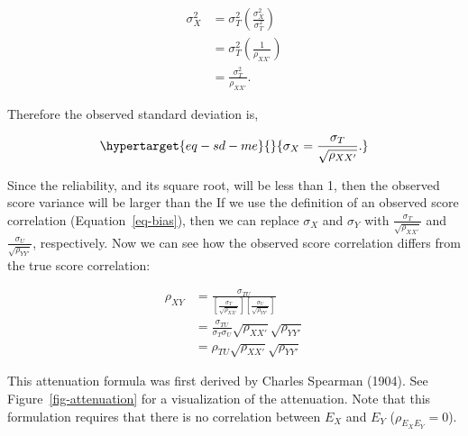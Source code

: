 \documentclass[
  letterpaper,
  DIV=11,
  numbers=noendperiod]{scrreprt}
\begin{document}
\[\begin{aligned}
\sigma^2_X &=\sigma^2_{T} \left(\frac{\sigma^2_{X}}{\sigma^2_{T}} \right)\\[.3em]
&= \sigma^2_{T}\left(\frac{1}{\rho_{XX'}} \right)\\[.3em]
&= \frac{\sigma^2_{T}}{\rho_{XX'}}.
\end{aligned}\]

Therefore the observed standard deviation is,

\begin{equation}\protect\hypertarget{eq-sd-me}{}{
\sigma_X = \frac{\sigma_{T}}{\sqrt{\rho_{XX'}}}.
}\label{eq-sd-me}\end{equation}

Since the reliability, and its square root, will be less than 1, then
the observed score variance will be larger than the If we use the
definition of an observed score correlation (Equation~\ref{eq-bias}),
then we can replace \(\sigma_X\) and \(\sigma_Y\) with
\(\frac{\sigma_{T}}{\sqrt{\rho_{XX'}}}\) and
\(\frac{\sigma_{U}}{\sqrt{\rho_{YY'}}}\), respectively. Now we can see
how the observed score correlation differs from the true score
correlation:

\[\begin{aligned}
\rho_{XY} &= \frac{\sigma_{T U}}{\left[\frac{\sigma_{T}}{\sqrt{\rho_{XX'}}} \right] \left[ \frac{\sigma_{U}}{\sqrt{\rho_{YY'}}} \right] } \\[.3em]
&= \frac{\sigma_{T U}}{\sigma_{T}\sigma_{U}}  \sqrt{\rho_{XX'}}\sqrt{\rho_{YY'}}\\[.3em]
&= \rho_{TU} \sqrt{\rho_{XX'}}\sqrt{\rho_{YY'}} 
\end{aligned}\]

This attenuation formula was first derived by Charles Spearman (1904).
See Figure~\ref{fig-attenuation} for a visualization of the attenuation.
Note that this formulation requires that there is no correlation between
\(E_X\) and \(E_Y\) (\(\rho_{E_X E_Y}=0\)).
\end{document}
